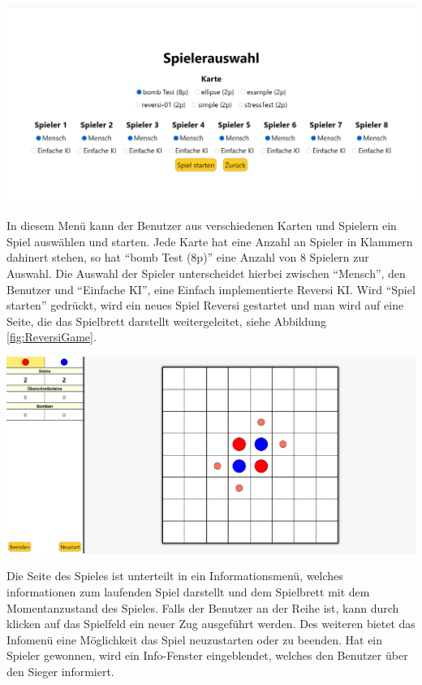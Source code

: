 \documentclass[12pt,a4paper,bibliography=totocnumbered,listof=totocnumbered]{article}
\begin{document}
\vspace{1em}
\begin{minipage}{\linewidth}
	\centering
	\includegraphics[width=0.7\linewidth]{pics/ReversiGameSelection.png}
	\label{fig:ReversiGameSelection}
\end{minipage}

In diesem Menü kann der Benutzer aus verschiedenen Karten und Spielern ein Spiel auswählen und starten. Jede Karte hat eine Anzahl an Spieler 
in Klammern dahinert stehen, so hat ``bomb Test (8p)'' eine Anzahl von 8 Spielern zur Auswahl. Die Auswahl der Spieler unterscheidet hierbei
zwischen ``Mensch'', den Benutzer und ``Einfache KI'', eine Einfach implementierte Reversi KI. Wird ``Spiel starten'' gedrückt, wird
ein neues Spiel Reversi gestartet und man wird auf eine Seite, die das Spielbrett darstellt weitergeleitet, siehe Abbildung \ref{fig:ReversiGame}.

\vspace{1em}
\begin{minipage}{\linewidth}
	\centering
	\includegraphics[width=0.7\linewidth]{pics/ReversiGame.png}
	\label{fig:ReversiGame}
\end{minipage}

Die Seite des Spieles ist unterteilt in ein Informationsmenü, welches informationen zum laufenden Spiel darstellt und dem Spielbrett mit dem
Momentanzustand des Spieles. Falls der Benutzer an der Reihe ist, kann durch klicken auf das Spielfeld ein neuer Zug ausgeführt werden.
Des weiteren bietet das Infomenü eine Möglichkeit das Spiel neuzustarten oder zu beenden. 
Hat ein Spieler gewonnen, wird ein Info-Fenster eingeblendet, welches den Benutzer über den Sieger informiert.
\end{document}
